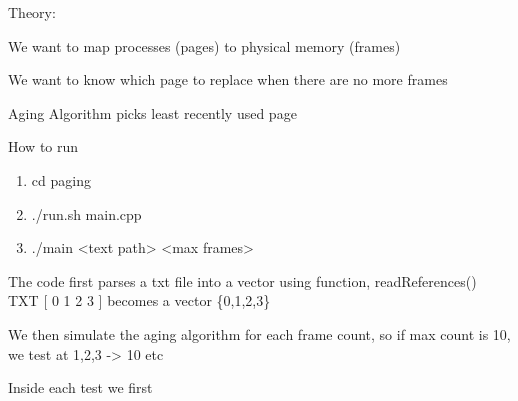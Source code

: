 Theory:

We want to map processes (pages) to physical memory (frames)

We want to know which page to replace when there are no more frames

Aging Algorithm picks least recently used page

How to run

\begin{enumerate}
\def\labelenumi{\arabic{enumi}.}
\item
  cd paging
\item
  ./run.sh main.cpp
\item
  ./main \textless text path\textgreater{} \textless max
  frames\textgreater{}
\end{enumerate}

The code first parses a txt file into a vector using function,
readReferences()\\
TXT {[} 0 1 2 3 {]} becomes a vector \{0,1,2,3\}

We then simulate the aging algorithm for each frame count, so if max
count is 10, we test at 1,2,3 -\textgreater{} 10 etc

Inside each test we first

